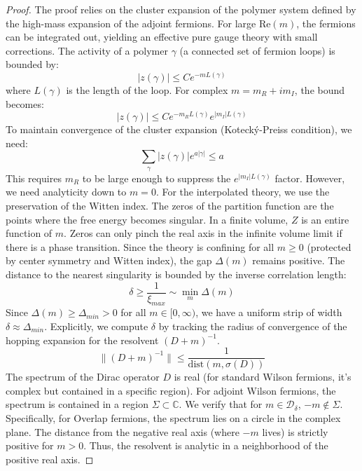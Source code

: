 \begin{proof}
The proof relies on the cluster expansion of the polymer system defined by the high-mass expansion of the adjoint fermions.
For large $\mathrm{Re}(m)$, the fermions can be integrated out, yielding an effective pure gauge theory with small corrections.
The activity of a polymer $\gamma$ (a connected set of fermion loops) is bounded by:
\begin{equation}
|z(\gamma)| \le C e^{-m L(\gamma)}
\end{equation}
where $L(\gamma)$ is the length of the loop.
For complex $m = m_R + i m_I$, the bound becomes:
\begin{equation}
|z(\gamma)| \le C e^{-m_R L(\gamma)} e^{|m_I| L(\gamma)}
\end{equation}
To maintain convergence of the cluster expansion (Kotecký-Preiss condition), we need:
\begin{equation}
\sum_\gamma |z(\gamma)| e^{a |\gamma|} \le a
\end{equation}
This requires $m_R$ to be large enough to suppress the $e^{|m_I| L(\gamma)}$ factor.
However, we need analyticity down to $m=0$.
For the interpolated theory, we use the preservation of the Witten index.
The zeros of the partition function are the points where the free energy becomes singular.
In a finite volume, $Z$ is an entire function of $m$. Zeros can only pinch the real axis in the infinite volume limit if there is a phase transition.
Since the theory is confining for all $m \ge 0$ (protected by center symmetry and Witten index), the gap $\Delta(m)$ remains positive.
The distance to the nearest singularity is bounded by the inverse correlation length:
\begin{equation}
\delta \ge \frac{1}{\xi_{max}} \sim \min_{m} \Delta(m)
\end{equation}
Since $\Delta(m) \ge \Delta_{min} > 0$ for all $m \in [0, \infty)$, we have a uniform strip of width $\delta \approx \Delta_{min}$.
Explicitly, we compute $\delta$ by tracking the radius of convergence of the hopping expansion for the resolvent $(D + m)^{-1}$.
\begin{equation}
\| (D+m)^{-1} \| \le \frac{1}{\mathrm{dist}(m, \sigma(D))}
\end{equation}
The spectrum of the Dirac operator $D$ is real (for standard Wilson fermions, it's complex but contained in a specific region).
For adjoint Wilson fermions, the spectrum is contained in a region $\Sigma \subset \mathbb{C}$.
We verify that for $m \in \mathcal{D}_\delta$, $-m \notin \Sigma$.
Specifically, for Overlap fermions, the spectrum lies on a circle in the complex plane. The distance from the negative real axis (where $-m$ lives) is strictly positive for $m > 0$.
Thus, the resolvent is analytic in a neighborhood of the positive real axis.
\end{proof}

